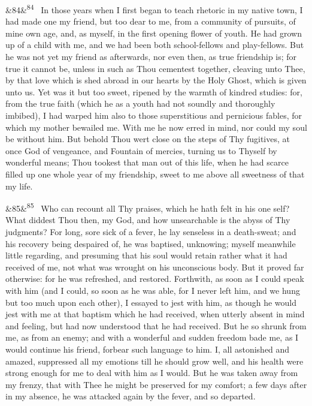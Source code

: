 \documentclass[12pt]{article}
\newcommand{\para}[1][]{\par\noindent\ifx&#1&\else\textsuperscript{\footnotesize #1}~\fi}
\begin{document}
\para[84] In those years when I first began to teach rhetoric in my native town, I had made one my friend, but too dear to me, from a community of pursuits, of mine own age, and, as myself, in the first opening flower of youth. He had grown up of a child with me, and we had been both school-fellows and play-fellows. But he was not yet my friend as afterwards, nor even then, as true friendship is; for true it cannot be, unless in such as Thou cementest together, cleaving unto Thee, by that love which is shed abroad in our hearts by the Holy Ghost, which is given unto us. Yet was it but too sweet, ripened by the warmth of kindred studies: for, from the true faith (which he as a youth had not soundly and thoroughly imbibed), I had warped him also to those superstitious and pernicious fables, for which my mother bewailed me. With me he now erred in mind, nor could my soul be without him. But behold Thou wert close on the steps of Thy fugitives, at once God of vengeance, and Fountain of mercies, turning us to Thyself by wonderful means; Thou tookest that man out of this life, when he had scarce filled up one whole year of my friendship, sweet to me above all sweetness of that my life.

\para[85] Who can recount all Thy praises, which he hath felt in his one self? What diddest Thou then, my God, and how unsearchable is the abyss of Thy judgments? For long, sore sick of a fever, he lay senseless in a death-sweat; and his recovery being despaired of, he was baptised, unknowing; myself meanwhile little regarding, and presuming that his soul would retain rather what it had received of me, not what was wrought on his unconscious body. But it proved far otherwise: for he was refreshed, and restored. Forthwith, as soon as I could speak with him (and I could, so soon as he was able, for I never left him, and we hung but too much upon each other), I essayed to jest with him, as though he would jest with me at that baptism which he had received, when utterly absent in mind and feeling, but had now understood that he had received. But he so shrunk from me, as from an enemy; and with a wonderful and sudden freedom bade me, as I would continue his friend, forbear such language to him. I, all astonished and amazed, suppressed all my emotions till he should grow well, and his health were strong enough for me to deal with him as I would. But he was taken away from my frenzy, that with Thee he might be preserved for my comfort; a few days after in my absence, he was attacked again by the fever, and so departed.
\end{document}
